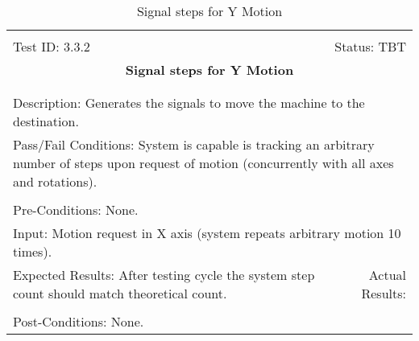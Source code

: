 \documentclass[titlepage]{article}
\begin{document}
\begin{center}%
\begin{table}[h!]
\begin{tabular}{|l r|}\hline&\\[-2mm]
	Test ID: 3.3.2	&Status: TBT\\[-3mm]
	\multicolumn{2}{|c|}{\textbf{\large{Signal steps for Y Motion}}}\\&\\\hline&\\[-3mm]
	\multicolumn{2}{|p{\textwidth}|}{Description: Generates the signals to move the machine to the destination.}\\\hline
	\multicolumn{2}{|p{\textwidth}|}{Pass/Fail Conditions: System is capable is tracking an arbitrary number of steps upon request of motion (concurrently with all axes and rotations).}\\[1mm]\hline&\\[-3mm]
	\multicolumn{2}{|p{\textwidth}|}{Pre-Conditions: None.}\\[4mm]
	\multicolumn{2}{|p{\textwidth}|}{Input: Motion request in X axis (system repeats arbitrary motion 10 times).}\\[2mm]\hline
	\multicolumn{1}{|p{0.49\textwidth}}{Expected Results: After testing cycle the system step count should match theoretical count.}	&\multicolumn{1}{|p{0.45\textwidth}|}{Actual Results: }\\\hline&\\[-3mm]
	\multicolumn{2}{|p{\textwidth}|}{Post-Conditions: None.}\\\hline
\end{tabular}
\caption{Signal steps for Y Motion}
\end{table}
\end{center}
\newpage
\end{document}
